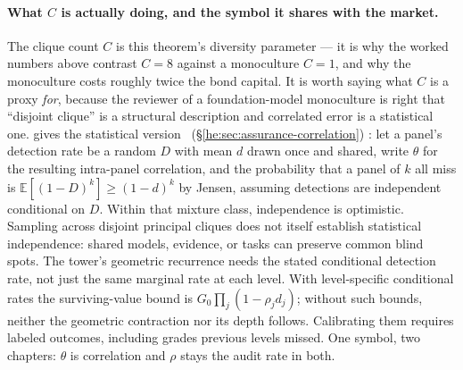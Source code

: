 \documentclass[11pt,a4paper]{article}
\theoremstyle{definition}
\begin{document}
\paragraph{What $C$ is actually doing, and the symbol it shares with the market.}
The clique count $C$ is this theorem's diversity parameter --- it is why the
worked numbers above contrast $C=8$ against a monoculture $C=1$, and why the
monoculture costs roughly twice the bond capital. It is worth saying what $C$
is a proxy \emph{for}, because the reviewer of a foundation-model monoculture
is right that ``disjoint clique'' is a structural description and correlated
error is a statistical one.  gives the
statistical version%
\ifpdbook
\ (\S\ref{he:sec:assurance-correlation})%
\fi
: let a panel's
detection rate be a random $D$ with mean $d$ drawn once and shared, write
$\theta$ for the resulting intra-panel correlation, and the probability that a
panel of $k$ all miss is $\mathbb{E}[(1-D)^k] \ge (1-d)^k$ by Jensen,
assuming detections are independent conditional on $D$.
Within that mixture class, independence is optimistic. Sampling across disjoint
principal cliques does not itself establish statistical independence: shared
models, evidence, or tasks can preserve common blind spots.
The tower's geometric recurrence needs the stated conditional detection rate,
not just the same marginal rate at each level. With level-specific conditional
rates the surviving-value bound is $G_0\prod_j(1-\rho_jd_j)$; without such
bounds, neither the geometric contraction nor its depth follows.
Calibrating them requires labeled outcomes, including grades previous levels
missed. One symbol, two chapters:
$\theta$ is correlation and $\rho$ stays the audit rate in both.
\end{document}

